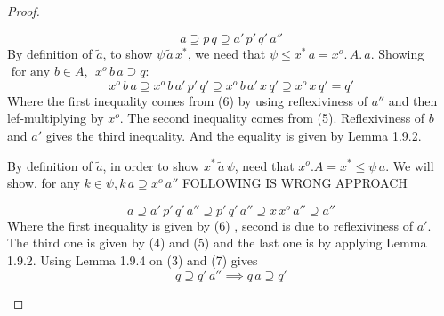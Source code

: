 \documentclass[18pt,a4paper]{article}
\theoremstyle{definition}
\begin{document}
\begin{proof}
\begin{enumerate}[label=(\roman*)]
				\begin{equation}
					a \supseteq p\,q \supseteq a'\,p'\,q'\,a''
				\end{equation}
				By definition of $\tilde{a}$, to show $\psi \, \tilde{a} \, x^*$,
				we need that $\psi \leq x^*\,a=x^o.\,A.\,a$. Showing
				$\text{ for any } b\in A$, $\;  x^o\,b\,a \supseteq q$:
				\[ x^o\,b\,a \supseteq x^o\,b\,a'\,p'\,q' \supseteq x^o\,b\,a'\,x\,q'
				\supseteq x^o\,x\,q'=q'\]
				Where the first inequality comes from (6) by using reflexiviness of $a''$ and then
				lef-multiplying by $x^o$. The second inequality comes from (5). Reflexiviness of $b$
				and $a'$ gives the third inequality. And the equality is given by Lemma 1.9.2.

				By definition of $\tilde{a}$, in order to show $x^* \, \tilde{a} \, \psi$,
				need that $x^o.A=x^* \leq \psi\,a$. We will show, for any $ k\in \psi,
				k\,a \supseteq x^o \, a''$
				FOLLOWING IS WRONG APPROACH

				\begin{equation}a\supseteq a'\,p'\,q'\,a'' \supseteq p'\,q'\,a'' \supseteq x \,x^o \,a''
				\supseteq a''\end{equation}
				Where the first inequality is given by (6) , second is due to reflexiviness
				of $a'$. The third one is given by (4) and (5) and the last one is by applying
				Lemma 1.9.2. Using Lemma 1.9.4 on (3) and (7) gives
				\[ q \supseteq q'\,a'' \implies q\,a \supseteq q' \]
		\end{enumerate}
	\end{proof}
	
\end{document}
